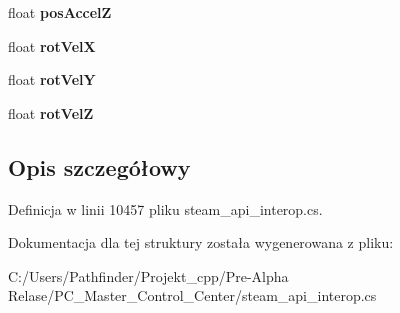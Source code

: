 \begin{DoxyCompactItemize}
float {\bfseries pos\+AccelZ}
\item 
\mbox{\label{struct_valve_1_1_steamworks_1_1_controller_motion_data__t_a3ba3fcbfe211821c8fa396dba37d908e}} 
float {\bfseries rot\+VelX}
\item 
\mbox{\label{struct_valve_1_1_steamworks_1_1_controller_motion_data__t_aa73b5596af344e99d3153f0ce5d84414}} 
float {\bfseries rot\+VelY}
\item 
\mbox{\label{struct_valve_1_1_steamworks_1_1_controller_motion_data__t_a0be15cfd538f62f14ca6061ea868d271}} 
float {\bfseries rot\+VelZ}
\end{DoxyCompactItemize}


\subsection{Opis szczegółowy}


Definicja w linii 10457 pliku steam\+\_\+api\+\_\+interop.\+cs.



Dokumentacja dla tej struktury została wygenerowana z pliku\+:\begin{DoxyCompactItemize}
\item 
C\+:/\+Users/\+Pathfinder/\+Projekt\+\_\+cpp/\+Pre-\/\+Alpha Relase/\+P\+C\+\_\+\+Master\+\_\+\+Control\+\_\+\+Center/steam\+\_\+api\+\_\+interop.\+cs\end{DoxyCompactItemize}
